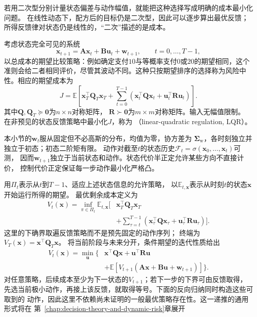 若用二次型分别计量状态偏差与动作幅值，就能把这种选择写成明确的成本最小化问题。
在线性动态下，配方后的目标仍是二次型，因此可以逐步算出最优反馈；
所得反馈律对状态仍是线性的，“二次”描述的是成本。
\begin{definition}[有限时域线性二次调节]
\label{def:control-finite-horizon-lqr}
考虑状态完全可见的系统
\begin{equation}
  \bm x_{t+1}=\bm A\bm x_t+\bm B\bm u_t+\bm w_{t+1},
  \qquad t=0,\ldots,T-1,
  \label{eq:control-lqr-dynamics}
\end{equation}
以总成本的期望比较策略：例如确定支付$10$与等概率支付$0$或$20$的期望相同，这个准则会给二者相同评价，尽管其波动不同。这种只按期望排序的选择称为风险中性。相应的期望成本为
\begin{equation}
  J=\mathbb E\left[
  \bm x_T^\top\bm Q_T\bm x_T+
  \sum_{t=0}^{T-1}
  (\bm x_t^\top\bm Q\bm x_t+\bm u_t^\top\bm R\bm u_t)\right].
  \label{eq:control-lqr-cost}
\end{equation}
其中$\bm Q,\bm Q_T\succeq\bm0$为$n\times n$对称矩阵，
$\bm R\succ\bm0$为$m\times m$对称矩阵。输入无幅值限制。
在非预见的状态反馈策略中最小化$J$，称为
（linear-quadratic regulation, LQR）。
\end{definition}

本小节的$\bm w_t$服从固定但不必高斯的分布，均值为零，协方差为
$\bm\Sigma_{\mathrm w}$，各时刻独立并独立于初态；初态二阶矩有限。
动作对截至$t$的状态历史$\mathcal F_t=\sigma(\bm x_0,\ldots,\bm x_t)$可测，
因而$\bm w_{t+1}$独立于当前状态和动作。状态代价半正定允许某些方向不直接计价，
控制代价正定保证每一步动作最小化严格凸。

用$\Pi_t$表示从$t$到$T-1$、适应上述状态信息的允许策略，
以$\mathbb E_{t,\bm x}$表示从时刻$t$的状态$\bm x$开始运行所得的期望。
最优剩余成本定义为
\[
  \begin{aligned}
  V_t(\bm x)=\inf_{\pi\in\Pi_t}\mathbb E_{t,\bm x}\biggl[
    &\bm x_T^\top\bm Q_T\bm x_T\\
    &+\sum_{\tau=t}^{T-1}
      (\bm x_\tau^\top\bm Q\bm x_\tau+
       \bm u_\tau^\top\bm R\bm u_\tau)\biggr].
  \end{aligned}
\]
这里的下确界取遍反馈策略而不是预先固定的动作序列；
终端为$V_T(\bm x)=\bm x^\top\bm Q_T\bm x$。
将当前阶段与未来分开，条件期望的迭代性质给出
\begin{equation}
  \begin{aligned}
  V_t(\bm x)=\min_{\bm u}\bigl\{&
    \bm x^\top\bm Q\bm x+\bm u^\top\bm R\bm u\\
    &+\mathbb E[V_{t+1}(\bm A\bm x+\bm B\bm u+\bm w_{t+1})]\bigr\}.
  \end{aligned}
  \label{eq:control-lqr-bellman}
\end{equation}
对任意策略，后续成本至少为下一状态的$V_{t+1}$；若下一步的下界可由反馈取得，
先选当前极小动作，再接上该反馈，就取得等号。下面的反向归纳同时构造这些可取到的
动作，因此这里不依赖尚未证明的一般最优策略存在性。这一递推的通用形式将在
第~\ref{chap:decision-theory-and-dynamic-risk}章展开

